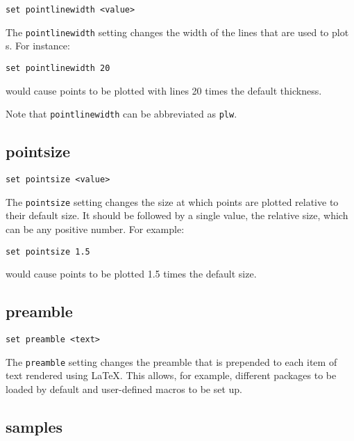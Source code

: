 \begin{verbatim}
set pointlinewidth <value>
\end{verbatim}

The {\tt pointlinewidth} setting changes the width of the lines that are used to
plot \datapoint s.  For instance:

\begin{verbatim}
set pointlinewidth 20
\end{verbatim}

\noindent would cause points to be plotted with lines 20 times the default thickness.

Note that {\tt pointlinewidth} can be abbreviated as {\tt plw}.

\subsection{pointsize}

\begin{verbatim}
set pointsize <value>
\end{verbatim}

The {\tt pointsize} setting changes the size at which points are plotted
relative to their default size. It should be followed by a single value, the
relative size, which can be any positive number. For example:

\begin{verbatim}
set pointsize 1.5
\end{verbatim}

\noindent would cause points to be plotted 1.5 times the default size.

\subsection{preamble}

\begin{verbatim}
set preamble <text>
\end{verbatim}

The {\tt preamble} setting changes the preamble that is prepended to each item of
text rendered using \LaTeX{}.  This allows, for example, different packages to
be loaded by default and user-defined macros to be set up.

\subsection{samples}

